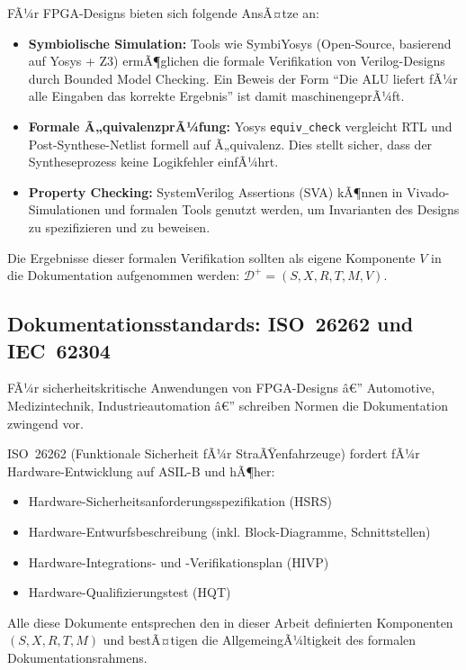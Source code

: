 ﻿\documentclass[a4paper,12pt]{article}
\theoremstyle{definition}
\begin{document}
FÃ¼r FPGA-Designs bieten sich folgende AnsÃ¤tze an:
\begin{itemize}
    \item \textbf{Symbio\-lische Simulation:} Tools wie SymbiYosys
          (Open-Source, basierend auf Yosys + Z3) ermÃ¶glichen die formale
          Verifikation von Verilog-Designs durch Bounded Model Checking.
          Ein Beweis der Form ``Die ALU liefert fÃ¼r alle Eingaben das
          korrekte Ergebnis'' ist damit maschinengeprÃ¼ft.
    \item \textbf{Formale Ã„quivalenzprÃ¼fung:} Yosys \texttt{equiv\_check}
          vergleicht RTL und Post-Synthese-Netlist formell auf Ã„quivalenz.
          Dies stellt sicher, dass der Syntheseprozess keine Logikfehler
          einfÃ¼hrt.
    \item \textbf{Property Checking:} SystemVerilog Assertions (SVA) kÃ¶nnen
          in Vivado-Simulationen und formalen Tools genutzt werden, um
          Invarianten des Designs zu spezifizieren und zu beweisen.
\end{itemize}

Die Ergebnisse dieser formalen Verifikation sollten als eigene Komponente
$V$ in die Dokumentation aufgenommen werden:
$\mathcal{D}^+ = (S, X, R, T, M, V)$.

\subsection{Dokumentationsstandards: ISO~26262 und IEC~62304}

FÃ¼r sicherheitskritische Anwendungen von FPGA-Designs â€” Automotive, Medizintechnik,
Industrieautomation â€” schreiben Normen die Dokumentation zwingend vor.

ISO~26262 (Funktionale Sicherheit fÃ¼r StraÃŸenfahrzeuge) fordert fÃ¼r
Hardware-Entwicklung auf ASIL-B und hÃ¶her:
\begin{itemize}
    \item Hardware-Sicherheitsanforderungsspezifikation (HSRS)
    \item Hardware-Entwurfsbeschreibung (inkl. Block-Diagramme, Schnittstellen)
    \item Hardware-Integrations- und -Verifikationsplan (HIVP)
    \item Hardware-Qualifizierungstest (HQT)
\end{itemize}

Alle diese Dokumente entsprechen den in dieser Arbeit definierten Komponenten
$(S, X, R, T, M)$ und bestÃ¤tigen die AllgemeingÃ¼ltigkeit des formalen
Dokumentationsrahmens.
\end{document}
